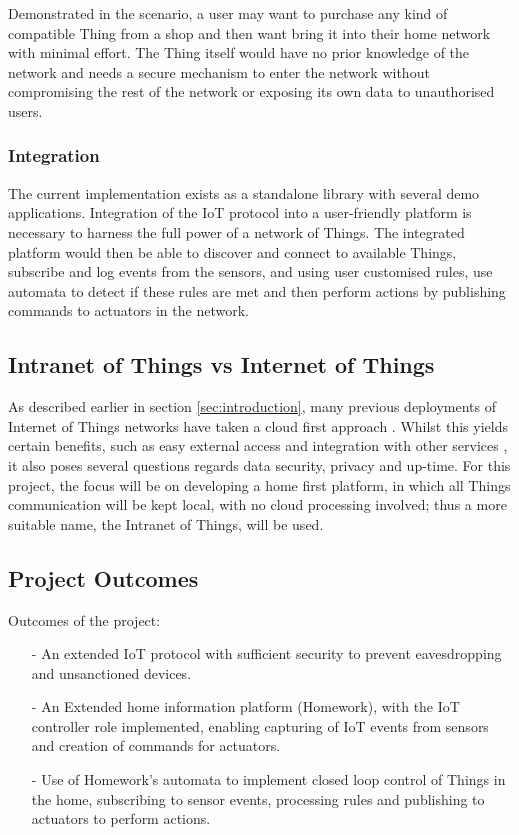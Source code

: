 \documentclass{mprop}
\begin{document}
Demonstrated in the scenario, a user may want to purchase any kind of compatible Thing from a shop and then want bring it into their home network with minimal effort. The Thing itself would have no prior knowledge of the network and needs a secure mechanism to enter the network without compromising the rest of the network or exposing its own data to unauthorised users. 

\subsubsection{Integration} %
\label{ssub:integration}

The current implementation exists as a standalone library with several demo applications. Integration of the IoT protocol into a user-friendly platform is necessary to harness the full power of a network of Things. The integrated platform would then be able to discover and connect to available Things, subscribe and log events from the sensors, and using user customised rules, use automata to detect if these rules are met and then perform actions by publishing commands to actuators in the network.

\subsection{Intranet of Things vs Internet of Things} %
\label{sub:intranet_of_things}

As described earlier in section \ref{sec:introduction}, many previous deployments of Internet of Things networks have taken a cloud first approach \cite{SmartThings, Twine}. Whilst this yields certain benefits, such as easy external access and integration with other services \cite{IFTTT, Xively}, it also poses several questions regards data security, privacy and up-time. For this project, the focus will be on developing a home first platform, in which all Things communication will be kept local, with no cloud processing involved; thus a more suitable name, the Intranet of Things, will be used. 

\subsection{Project Outcomes} %
\label{sub:project_outcomes}

Outcomes of the project:
\begin{itemize}
  \item[-] An extended IoT protocol with sufficient security to prevent eavesdropping and unsanctioned devices.
  \item[-] An Extended home information platform (Homework), with the IoT controller role implemented, enabling capturing of IoT events from sensors and creation of commands for actuators.
  \item[-] Use of Homework's automata to implement closed loop control of Things in the home, subscribing to sensor events, processing rules and publishing to actuators to perform actions.
\end{itemize}
\end{document}
